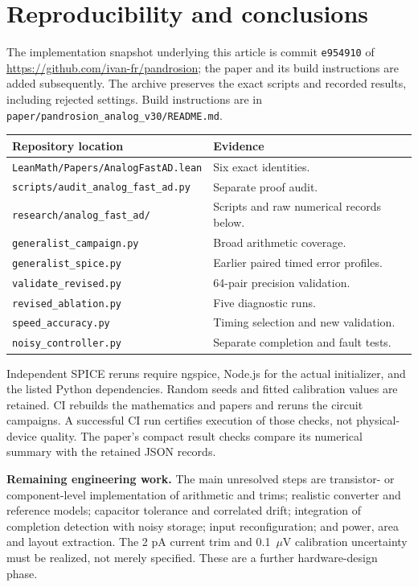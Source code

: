 \documentclass[11pt,a4paper]{article}
\newcommand{\repo}{\url{https://github.com/ivan-fr/pandrosion}}
\begin{document}
\section{Reproducibility and conclusions}
The implementation snapshot underlying this article is commit \texttt{e954910} of \repo; the paper and its build instructions are added subsequently. The archive preserves the exact scripts and recorded results, including rejected settings. Build instructions are in \texttt{paper/pandrosion\_analog\_v30/README.md}.

\begin{center}\small
\begin{tabularx}{\linewidth}{@{}lX@{}}\toprule
Repository location & Evidence\\\midrule
\texttt{LeanMath/Papers/AnalogFastAD.lean} & Six exact identities.\\
\texttt{scripts/audit\_analog\_fast\_ad.py} & Separate proof audit.\\
\texttt{research/analog\_fast\_ad/} & Scripts and raw numerical records below.\\
\quad\texttt{generalist\_campaign.py} & Broad arithmetic coverage.\\
\quad\texttt{generalist\_spice.py} & Earlier paired timed error profiles.\\
\quad\texttt{validate\_revised.py} & 64-pair precision validation.\\
\quad\texttt{revised\_ablation.py} & Five diagnostic runs.\\
\quad\texttt{speed\_accuracy.py} & Timing selection and new validation.\\
\quad\texttt{noisy\_controller.py} & Separate completion and fault tests.\\\bottomrule
\end{tabularx}\end{center}
Independent SPICE reruns require ngspice, Node.js for the actual initializer, and the listed Python dependencies. Random seeds and fitted calibration values are retained. CI rebuilds the mathematics and papers and reruns the circuit campaigns. A successful CI run certifies execution of those checks, not physical-device quality. The paper's compact result checks compare its numerical summary with the retained JSON records.

\textbf{Remaining engineering work.} The main unresolved steps are transistor- or component-level implementation of arithmetic and trims; realistic converter and reference models; capacitor tolerance and correlated drift; integration of completion detection with noisy storage; input reconfiguration; and power, area and layout extraction. The 2 pA current trim and 0.1~$\mu$V calibration uncertainty must be realized, not merely specified. These are a further hardware-design phase.
\end{document}
